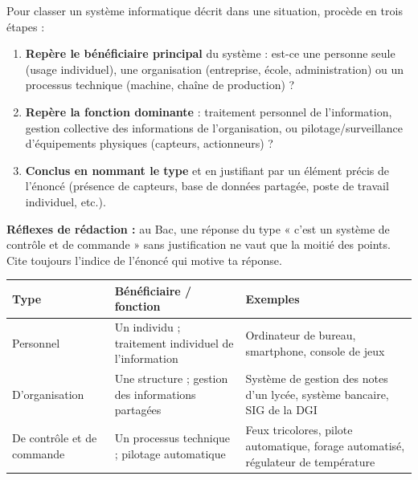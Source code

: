 \documentclass[11pt]{article}
\begin{document}
\begin{methode}
Pour classer un système informatique décrit dans une situation, procède en trois étapes :
\begin{enumerate}
\item \textbf{Repère le bénéficiaire principal} du système : est-ce une personne seule (usage individuel), une organisation (entreprise, école, administration) ou un processus technique (machine, chaîne de production) ?
\item \textbf{Repère la fonction dominante} : traitement personnel de l'information, gestion collective des informations de l'organisation, ou pilotage/surveillance d'équipements physiques (capteurs, actionneurs) ?
\item \textbf{Conclus en nommant le type} et en justifiant par un élément précis de l'énoncé (présence de capteurs, base de données partagée, poste de travail individuel, etc.).
\end{enumerate}
\textbf{Réflexes de rédaction :} au Bac, une réponse du type « c'est un système de contrôle et de commande » sans justification ne vaut que la moitié des points. Cite toujours l'indice de l'énoncé qui motive ta réponse.
\begin{center}
\begin{tabularx}{\linewidth}{|l|X|X|}
\hline
\rowcolor{popblueL} \textbf{Type} & \textbf{Bénéficiaire / fonction} & \textbf{Exemples} \\
\hline
Personnel & Un individu ; traitement individuel de l'information & Ordinateur de bureau, smartphone, console de jeux \\
\hline
D'organisation & Une structure ; gestion des informations partagées & Système de gestion des notes d'un lycée, système bancaire, SIG de la DGI \\
\hline
De contrôle et de commande & Un processus technique ; pilotage automatique & Feux tricolores, pilote automatique, forage automatisé, régulateur de température \\
\hline
\end{tabularx}
\end{center}
\end{methode}
\end{document}
